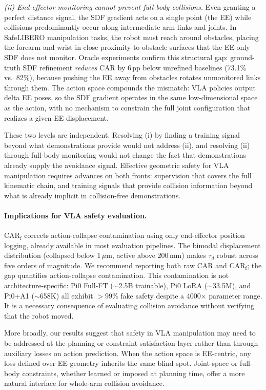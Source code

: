\textit{(ii) End-effector monitoring cannot prevent full-body collisions.} Even granting a perfect distance signal, the SDF gradient acts on a single point (the EE) while collisions predominantly occur along intermediate arm links and joints. In SafeLIBERO manipulation tasks, the robot must reach around obstacles, placing the forearm and wrist in close proximity to obstacle surfaces that the EE-only SDF does not monitor. Oracle experiments confirm this structural gap: ground-truth SDF refinement \emph{reduces} CAR by 6\,pp below unrefined baselines (73.1\% vs.\ 82\%), because pushing the EE away from obstacles rotates unmonitored links through them. The action space compounds the mismatch: VLA policies output delta EE poses, so the SDF gradient operates in the same low-dimensional space as the action, with no mechanism to constrain the full joint configuration that realizes a given EE displacement.

These two levels are independent. Resolving (i) by finding a training signal beyond what demonstrations provide would not address (ii), and resolving (ii) through full-body monitoring would not change the fact that demonstrations already supply the avoidance signal. Effective geometric safety for VLA manipulation requires advances on both fronts: supervision that covers the full kinematic chain, and training signals that provide collision information beyond what is already implicit in collision-free demonstrations.

\paragraph{Implications for VLA safety evaluation.}
CAR$_\text{f}$ corrects action-collapse contamination using only end-effector position logging, already available in most evaluation pipelines. The bimodal displacement distribution (collapsed below 1\,$\mu$m, active above 200\,mm) makes $\tau_d$ robust across five orders of magnitude. We recommend reporting both raw CAR and CAR$_\text{f}$; the gap quantifies action-collapse contamination. This contamination is not architecture-specific: Pi0 Full-FT (${\sim}$2.5B trainable), Pi0 LoRA (${\sim}$33.5M), and Pi0+A1 (${\sim}$658K) all exhibit $>$99\% fake safety despite a 4000$\times$ parameter range. It is a necessary consequence of evaluating collision avoidance without verifying that the robot moved.

More broadly, our results suggest that safety in VLA manipulation may need to be addressed at the planning or constraint-satisfaction layer rather than through auxiliary losses on action prediction. When the action space is EE-centric, any loss defined over EE geometry inherits the same blind spot. Joint-space or full-body constraints, whether learned or imposed at planning time, offer a more natural interface for whole-arm collision avoidance.

